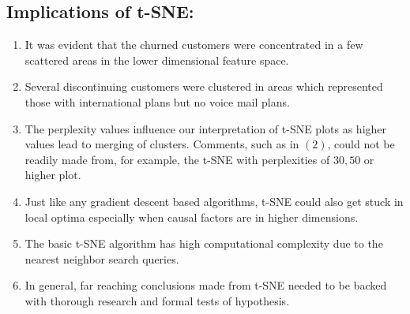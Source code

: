 \documentclass{article}
\begin{document}
\subsection*{Implications of t-SNE:}
\begin{enumerate}
	\item It was evident that the churned customers were concentrated in a few scattered areas in the lower dimensional feature space.
	\item Several discontinuing customers were clustered in areas which represented those with international plans but no voice mail plans.
	\item The perplexity values influence our interpretation of t-SNE plots as higher values lead to merging of clusters. Comments, such as in $(2)$, could not be readily made from, for example, the t-SNE with perplexities of $30, 50$ or higher plot.
	\item Just like any gradient descent based algorithms, t-SNE could also get stuck in local optima especially when causal factors are in higher dimensions.
	\item The basic t-SNE algorithm has high computational complexity due to the nearest neighbor search queries.
	\item In general, far reaching conclusions made from t-SNE needed to be backed with thorough research and formal tests of hypothesis.
\end{enumerate}
\end{document}
